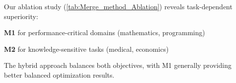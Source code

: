 Our ablation study (\ref{tab:Merge_method_Ablation}) reveals task-dependent superiority:
\begin{compactitem}
\item \textbf{M1} for performance-critical domains (mathematics, programming)
\item \textbf{M2} for knowledge-sensitive tasks (medical, economics) 
\end{compactitem}
The hybrid approach balances both objectives, with M1 generally providing better balanced optimization results.





